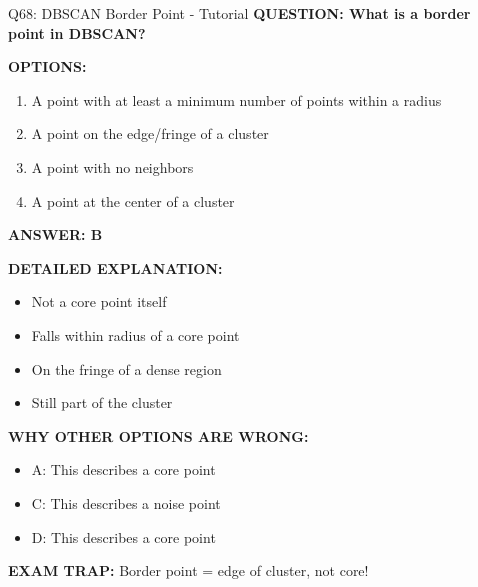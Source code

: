 \documentclass[8pt]{beamer}
\begin{document}
	\begin{frame}{Q68: DBSCAN Border Point - Tutorial}
		\fontsize{6.5}{7.5}\selectfont
		\textbf{QUESTION: What is a border point in DBSCAN?}
		
		\vspace{0.1cm}
		\textbf{OPTIONS:}
		\begin{enumerate}
			\item A point with at least a minimum number of points within a radius
			\item A point on the edge/fringe of a cluster
			\item A point with no neighbors
			\item A point at the center of a cluster
		\end{enumerate}
		
		\vspace{0.1cm}
		\textcolor{myblue}{\textbf{ANSWER: B}}
		
		\vspace{0.1cm}
		\textbf{DETAILED EXPLANATION:}
		\begin{itemize}
			\item Not a core point itself
			\item Falls within radius of a core point
			\item On the fringe of a dense region
			\item Still part of the cluster
		\end{itemize}
		
		\vspace{0.1cm}
		\textcolor{myred}{\textbf{WHY OTHER OPTIONS ARE WRONG:}}
		\begin{itemize}
			\item \textcolor{myred}{A:} This describes a core point
			\item \textcolor{myred}{C:} This describes a noise point
			\item \textcolor{myred}{D:} This describes a core point
		\end{itemize}
		
		\textcolor{myred}{\textbf{EXAM TRAP:}} Border point = \textcolor{myblue}{edge of cluster}, not core!
	\end{frame}
	
\end{document}

